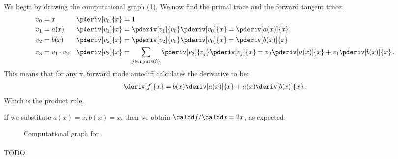 \paragraph{}
We begin by drawing the computational graph (\cref{fig:qproductrule-compgraph}). %
We now find the primal trace and the forward tangent trace:
\begin{align}
v_0 &= x && \pderiv[v_0]{x} = 1 \\
v_1 &= a(x) && \pderiv[v_1]{x} = \pderiv[v_1]{v_0}\pderiv[v_0]{x} = \pderiv[a(x)]{x} \\
v_2 &= b(x) && \pderiv[v_2]{x} = \pderiv[v_2]{v_0}\pderiv[v_0]{x} = \pderiv[b(x)]{x} \\
v_3 &= v_1 \cdot v_2 && \pderiv[v_3]{x} = \sum_{j \in \mathrm{inputs}(3)}\pderiv[v_3]{v_j}\pderiv[v_j]{x} = v_2\pderiv[a(x)]{x} + v_1\pderiv[b(x)]{x} \,.
\end{align}
This means that for any x, forward mode autodiff calculates the derivative to be:
\begin{align}
\deriv[f]{x} = b(x)\deriv[a(x)]{x} + a(x)\deriv[b(x)]{x} \,.
\end{align}
Which is the product rule.

If we substitute $a(x) = x, b(x) = x$, then we obtain $\calcd f / \calcd x = 2x$, as expected.


\begin{figure}[t]
\centering
\caption{Computational graph for .}
\label{fig:qproductrule-compgraph}
\end{figure}



\paragraph{} TODO

